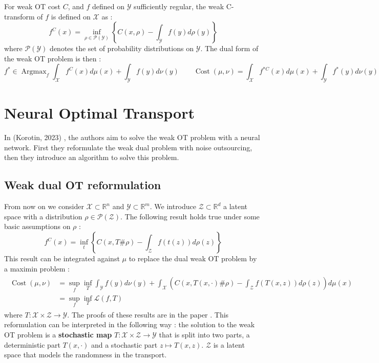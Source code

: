 \documentclass[11pt]{article}
\newcommand{\R}{\mathbb{R}}
\DeclareMathOperator*{\Argmax}{\text{Argmax}}
\DeclareMathOperator*{\Cost}{\text{Cost}}
\begin{document}
For weak OT cost $C$, and $f$ defined on $\mathcal{Y}$ sufficiently regular, the weak C-transform of $f$ is defined on $\mathcal{X}$ as :
\begin{equation}
    f^C(x) = \inf_{\rho\in \mathcal{P}(\mathcal{Y})} \left\{C(x,\rho)-\int_{\mathcal{Y}}f(y)d\rho(y)\right\}
\end{equation}
where $\mathcal{P}(\mathcal{Y})$ denotes the set of probability distributions on $\mathcal{Y}$. The dual form of the weak OT problem is then :
\begin{equation}
    f^*\in\Argmax_{f} \int_{\mathcal{X}} f^C(x)d\mu(x) + \int_{\mathcal{Y}} f(y)d\nu(y) \quad\quad \Cost(\mu,\nu) = \int_{\mathcal{X}} f^{*C}(x)d\mu(x) + \int_{\mathcal{Y}} f^*(y)d\nu(y)
\end{equation}

\section{Neural Optimal Transport}

In (Korotin, 2023) \cite{korotin-2022}, the authors aim to solve the weak OT problem with a neural network. First they reformulate the weak dual problem with noise outsourcing, then they introduce an algorithm to solve this problem.

\subsection{Weak dual OT reformulation}

From now on we consider $\mathcal{X}\subset\R^n$ and $\mathcal{Y}\subset\R^m$. We introduce $\mathcal{Z}\subset\R^d$ a latent space with a distribution $\rho\in \mathcal{P}(\mathcal{Z})$. The following result holds true under some basic assumptions on $\rho$ :
\begin{equation}
    f^C(x)=\inf_t \left\{C(x, T\#\rho)-\int_{\mathcal{Z}}f(t(z))d\rho(z)\right\}
\end{equation}
This result can be integrated against $\mu$ to replace the dual weak OT problem by a maximin problem :
\begin{align}
    \begin{split}
        \Cost(\mu,\nu) & = \sup_{f} \inf_{T}
        \int_{\mathcal{Y}}f(y)d\nu(y) + \int_{\mathcal{X}} \left( C(x, T(x,\cdot)\#\rho)-\int_{\mathcal{Z}}f(T(x,z))d\rho(z)\right)d\mu(x) \\
                       & = \sup_{f} \inf_{T} \mathcal{L}(f,T)
    \end{split}
    \label{eq:weak_ot_reformulation}
\end{align}
where $T:\mathcal{X}\times\mathcal{Z}\to\mathcal{Y}$. The proofs of these results are in the paper \cite{korotin-2022}. This reformulation can be interpreted in the following way : the solution to the weak OT problem is a \textbf{stochastic map} $T:\mathcal{X}\times \mathcal{Z}\to \mathcal{Y}$ that is split into two parts, a deterministic part $T(x,\cdot)$ and a stochastic part $z\mapsto T(x,z)$. $\mathcal{Z}$ is a latent space that models the randomness in the transport. 
\end{document}
